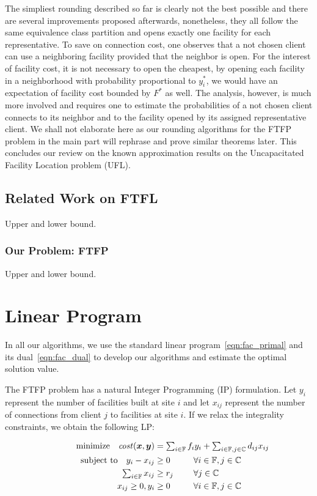 \documentclass[oneside,final]{ucr}
\begin{document}
The simpliest rounding described so far is clearly not the
best possible and there are several improvements proposed
afterwards, nonetheless, they all follow the same
equivalence class partition and opens exactly one facility
for each representative. To save on connection cost, one
observes that a not chosen client can use a neighboring
facility provided that the neighbor is open. For the
interest of facility cost, it is not necessary to open the
cheapest, by opening each facility in a neighborhood with
probability proportional to $y_i^\ast$, we would have an
expectation of facility cost bounded by $F^\ast$ as
well. The analysis, however, is much more involved and
requires one to estimate the probabilities of a not chosen
client connects to its neighbor and to the facility opened
by its assigned representative client. We shall not
elaborate here as our rounding algorithms for the FTFP
problem in the main part will rephrase and prove similar
theorems later. This concludes our review on the known
approximation results on the Uncapacitated Facility Location
problem (UFL).


\section{Related Work on FTFL}
Upper and lower bound.

\subsection{Our Problem: FTFP}
Upper and lower bound.


\chapter{Linear Program} \label{ch:lp} 

In all our algorithms, we use the standard linear
program~\ref{eqn:fac_primal} and its dual~\ref{eqn:fac_dual}
to develop our algorithms and estimate the optimal solution
value.

The FTFP problem has a natural Integer Programming (IP)
formulation. Let $y_i$ represent the number of facilities
built at site $i$ and let $x_{ij}$ represent the number of
connections from client $j$ to facilities at site $i$. If we
relax the integrality constraints, we obtain the following LP:

\begin{alignat}{3}
  \textrm{minimize} \quad \cost(\bfx,\bfy) &= \textstyle{\sum_{i\in \sitesset}f_iy_i 
								+ \sum_{i\in \sitesset, j\in \clientset}d_{ij}x_{ij}}\label{eqn:fac_primal}\hspace{-1.5in}&&
									\\ \notag
  \textrm{subject to}\quad y_i - x_{ij} &\geq 0 			&\quad 		&\forall i\in \sitesset, j\in \clientset 
									\\ \notag
     \textstyle{\sum_{i\in \sitesset} x_{ij}} &\geq r_j  &			&\forall j\in \clientset
 									\\ \notag
  	  x_{ij} \geq 0, y_i &\geq 0 						& 			&\forall i\in \sitesset, j\in \clientset 
  									\\ \notag
\end{alignat}
\end{document}
